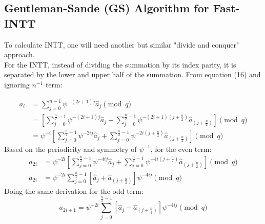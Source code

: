 \documentclass[12pt]{report}
\begin{document}
\subsection{Gentleman-Sande (GS) Algorithm for Fast-INTT}

To calculate INTT, one will need another but similar "divide and conquer" approach.\\
For the INTT, instead of dividing the summation by its index parity, it is separated by the lower and upper half of the summation. From equation (16) and ignoring $n^{-1}$ term:

\begin{align*}
a_{i} &= \sum_{j=0}^{n-1}\psi^{-(2i+1)j}\hat{a}_{j} \pmod{q} \\
&= \left[\sum_{j=0}^{\frac{n}{2}-1}\psi^{-(2i+1)j}\hat{a}_{j}+\sum_{j=0}^{\frac{n}{2}-1}\psi^{-(2i+1)(j+\frac{n}{2})}\hat{a}_{(j+\frac{n}{2})}\right] \pmod{q} \\
&=\psi^{-i}\left[\sum_{j=0}^{\frac{n}{2}-1}\psi^{-2ij}\hat{a}_{j}+\sum_{j=0}^{\frac{n}{2}-1}\psi^{-2i(j+\frac{n}{2})}\hat{a}_{(j+\frac{n}{2})}\right] \pmod{q}
\end{align*}
Based on the periodicity and symmetry of $\psi^{-1}$, for the even term:
\begin{align*}
a_{2i} &= \psi^{-2i}\left[\sum_{j=0}^{\frac{n}{2}-1}\psi^{-4ij}\hat{a}_{j}+\sum_{j=0}^{\frac{n}{2}-1}\psi^{-4i(j+\frac{n}{2})}\hat{a}_{(j+\frac{n}{2})}\right] \pmod{q} \\
a_{2i} &= \psi^{-2i}\sum_{j=0}^{\frac{n}{2}-1}\left[\hat{a}_{j}+\hat{a}_{(j+\frac{n}{2})}\right]\psi^{-4ij} \pmod{q}
\end{align*}
Doing the same derivation for the odd term:
\[a_{2i+1}=\psi^{-2i}\sum_{j=0}^{\frac{n}{2}-1}\left[\hat{a}_{j}-\hat{a}_{(j+\frac{n}{2})}\right]\psi^{-4ij} \pmod{q}\]
\end{document}
